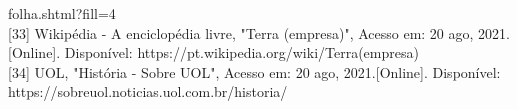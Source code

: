 \documentclass[a4paper]{article}
\begin{document}
\begin{titlepage}
folha.shtml?fill=4\\[0.5cm] [33] Wikipédia - A enciclopédia livre, "Terra (empresa)", Acesso em: 20 ago, 2021. [Online]. Disponível: https://pt.wikipedia.org/wiki/Terra\textunderscore (empresa)\\[0.5cm] [34] UOL, "História - Sobre UOL", Acesso em: 20 ago, 2021.[Online]. Disponível: https://sobreuol.noticias.uol.com.br/historia/
\end{titlepage}
\end{document}
